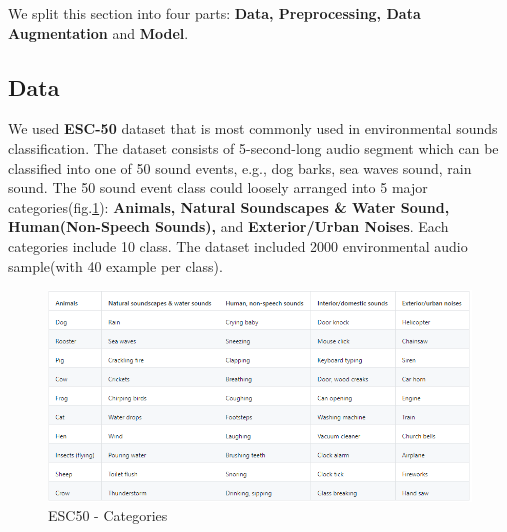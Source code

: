 We split this section into four parts: \textbf{Data, Preprocessing, Data Augmentation} and \textbf{Model}.
\subsection{Data}
We used \textbf{ESC-50} dataset\cite{ESC50} that is most commonly used in environmental sounds classification. The dataset consists of 5-second-long audio segment which can be classified into one of 50 sound events, e.g., dog barks, sea waves sound, rain sound.
The 50 sound event class could loosely arranged into 5 major categories(fig.\ref{esc}): \textbf{Animals, Natural Soundscapes \& Water Sound, Human(Non-Speech Sounds), }and \textbf{Exterior/Urban Noises}. Each categories include 10 class.
The dataset included 2000 environmental audio sample(with 40 example per class).
\begin{figure}[H]
\centering
\includegraphics[width=\textwidth]{./graph/ESC50-categories.PNG} 
\caption{ESC50 - Categories}
\label{esc}
\end{figure}
